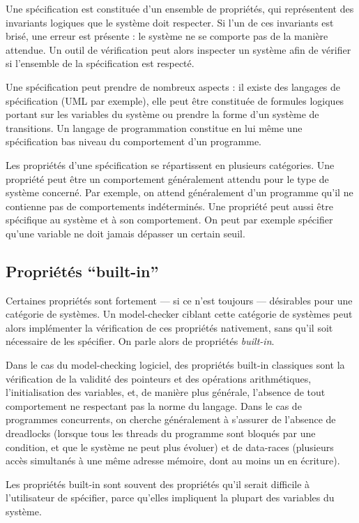 Une spécification est constituée d'un ensemble de propriétés, qui représentent
des invariants logiques que le système doit respecter. Si l'un de ces invariants
est brisé, une erreur est présente : le système ne se comporte pas de la manière
attendue. Un outil de vérification peut alors inspecter un système afin de
vérifier si l'ensemble de la spécification est respecté.

Une spécification peut prendre de nombreux aspects : il existe des langages de
spécification (UML par exemple), elle peut être constituée de formules logiques
portant sur les variables du système ou prendre la forme d'un système de
transitions. Un langage de programmation constitue en lui même une spécification
bas niveau du comportement d'un programme.

Les propriétés d'une spécification se répartissent en plusieurs catégories. Une
propriété peut être un comportement généralement attendu pour le type de système
concerné. Par exemple, on attend généralement d'un programme qu'il ne contienne
pas de comportements indéterminés. Une propriété peut aussi être spécifique au
système et à son comportement. On peut par exemple spécifier qu'une variable ne
doit jamais dépasser un certain seuil.

\subsection{\texorpdfstring{Propriétés ``built-in''}{Propriétés built-in}}

Certaines propriétés sont fortement --- si ce n'est toujours --- désirables
pour une catégorie de systèmes. Un model-checker ciblant cette catégorie
de systèmes peut alors implémenter la vérification de ces propriétés
nativement, sans qu'il soit nécessaire de les spécifier. On parle alors
de propriétés \emph{built-in}.

Dans le cas du model-checking logiciel, des propriétés built-in
classiques sont la vérification de la validité des pointeurs et des
opérations arithmétiques, l'initialisation des variables, et, de manière
plus générale, l'absence de tout comportement ne respectant pas la norme
du langage.
Dans le cas de programmes concurrents, on cherche généralement à s'assurer de
l'absence de dreadlocks (lorsque tous les threads du programme sont bloqués par une
condition, et que le système ne peut plus évoluer) et de data-races (plusieurs
accès simultanés à une même adresse mémoire, dont au moins un en écriture).

Les propriétés built-in sont souvent des propriétés qu'il serait difficile à
l'utilisateur de spécifier, parce qu'elles impliquent la plupart des variables
du système.

